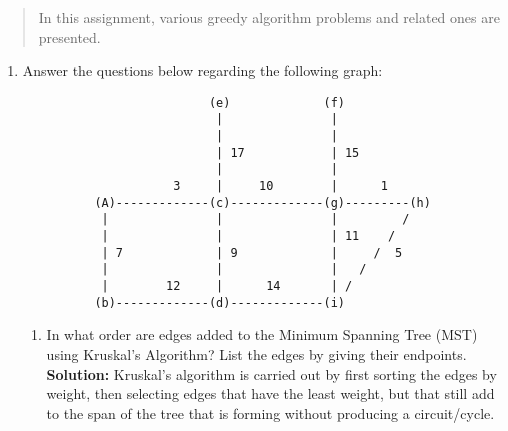 \documentclass[11pts]{article}
\begin{document}
\maketitle

\begin{abstract}
In this assignment, various greedy algorithm problems and related ones are
presented.
\end{abstract}
\newpage

\begin{enumerate}
\item Answer the questions below regarding the following graph:
\begin{verbatim}
                          (e)             (f)
                           |               |
                           |               |
                           | 17            | 15
                           |               |
                     3     |     10        |      1
          (A)-------------(c)-------------(g)---------(h)
           |               |               |         /
           |               |               | 11    /
           | 7             | 9             |     /  5
           |               |               |   /
           |        12     |      14       | /
          (b)-------------(d)-------------(i)
\end{verbatim}

\begin{enumerate}
  \item In what order are edges added to the Minimum Spanning Tree
  (MST) using Kruskal's Algorithm? List the edges by giving their endpoints. \\

  \textbf{Solution:} Kruskal's algorithm is carried out by first sorting
  the edges by weight, then selecting edges that have the least weight, but
  that still add to the span of the tree that is forming
  without producing a circuit/cycle. \\


\end{enumerate}
\end{enumerate}
\end{document}
